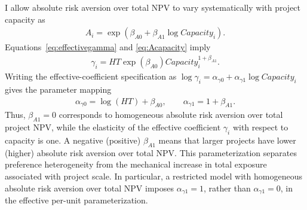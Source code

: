 \documentclass[10pt]{article}
\theoremstyle{plain}
\theoremstyle{definition}
\begin{document}
I allow absolute risk aversion over total NPV to vary systematically with
project capacity as
\begin{align}
\label{eq:Acapacity}
A_i=\exp\!\left(\beta_{A0}+\beta_{A1}\log Capacity_i\right).
\end{align}
Equations~\eqref{eq:effectivegamma} and \eqref{eq:Acapacity} imply
\begin{align}
\label{eq:gammacapacity}
\gamma_i
=HT\exp(\beta_{A0})Capacity_i^{1+\beta_{A1}}.
\end{align}
Writing the effective-coefficient specification as
$\log\gamma_i=\alpha_{\gamma0}+\alpha_{\gamma1}\log Capacity_i$ gives the
parameter mapping
\begin{align}
\label{eq:parameter_mapping}
\alpha_{\gamma0}=\log(HT)+\beta_{A0},
\qquad
\alpha_{\gamma1}=1+\beta_{A1}.
\end{align}
Thus, $\beta_{A1}=0$ corresponds to homogeneous absolute risk aversion over
total project NPV, while the elasticity of the effective coefficient
$\gamma_i$ with respect to capacity is one. A negative (positive)
$\beta_{A1}$ means that larger projects have lower (higher) absolute risk
aversion over total NPV. This parameterization separates preference
heterogeneity from the mechanical increase in total exposure associated with
project scale. In particular, a restricted model with homogeneous absolute
risk aversion over total NPV imposes $\alpha_{\gamma1}=1$, rather than
$\alpha_{\gamma1}=0$, in the effective per-unit parameterization.
\end{document}

